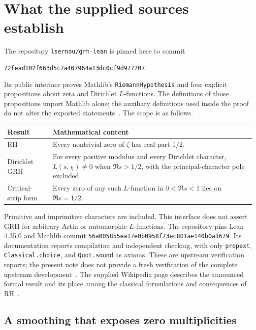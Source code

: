 \section{What the supplied sources establish}
\label{sec:sources}

The repository \texttt{lsernau/grh-lean} is pinned here to commit
\begin{center}
\small\texttt{72fead102f663d5c7a407964a13dc0cf9d977207}.
\end{center}
Its public interface proves Mathlib's \texttt{RiemannHypothesis} and four
explicit propositions about zeta and Dirichlet \(L\)-functions. The definitions
of those propositions import Mathlib alone; the auxiliary definitions used
inside the proof do not alter the exported statements~\cite{statements}.
The scope is as follows.

\begin{center}
\begin{tabularx}{\linewidth}{@{}lX@{}}
\toprule
Result & Mathematical content \\
\midrule
RH & Every nontrivial zero of \(\zeta\) has real part \(1/2\). \\
Dirichlet GRH & For every positive modulus and every Dirichlet character,
\(L(s,\chi)\ne0\) when \(\Re s>1/2\), with the principal-character pole excluded. \\
Critical-strip form & Every zero of any such \(L\)-function in
\(0<\Re s<1\) lies on \(\Re s=1/2\). \\
\bottomrule
\end{tabularx}
\end{center}

Primitive and imprimitive characters are included. This interface does not
assert GRH for arbitrary Artin or automorphic \(L\)-functions.
The repository pins Lean 4.35.0 and Mathlib commit
\nolinkurl{56a005855ea17e0b0958f73ec801ae140b0a1679}.
Its documentation reports compilation and independent checking, with only
\texttt{propext}, \texttt{Classical.choice}, and \texttt{Quot.sound} as axioms.
These are upstream verification reports; the present note does not provide a
fresh verification of the complete upstream development~\cite{repo}.
The supplied Wikipedia page describes the announced formal result and its
place among the classical formulations and consequences of RH~\cite{wiki}.

\subsection{A smoothing that exposes zero multiplicities}

